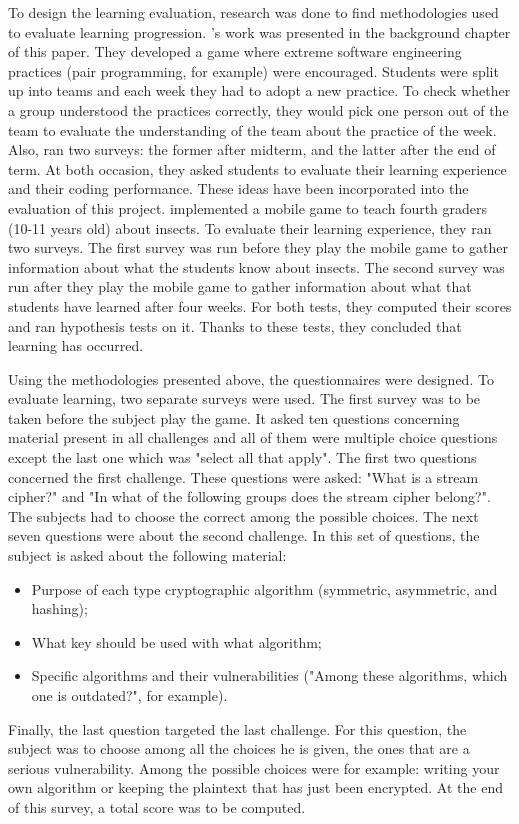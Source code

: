 \documentclass{l4proj}
\begin{document}
To design the learning evaluation, research was done to find methodologies used to evaluate learning progression.
\citet{akpolat_enhancing_2014}'s work was presented in the background chapter of this paper. 
They developed a game where extreme software engineering practices (pair programming, for example) were encouraged.
Students were split up into teams and each week they had to adopt a new practice.
To check whether a group understood the practices correctly, they would pick one person out of the team 
to evaluate the understanding of the team about the practice of the week.
Also, \citet{akpolat_enhancing_2014} ran two surveys: the former after midterm, and the latter after the end of term.
At both occasion, they asked students to evaluate their learning experience and their coding performance.
These ideas have been incorporated into the evaluation of this project.
\citet{su_mobile_2015} implemented a mobile game to teach fourth graders (10-11 years old) about insects.
To evaluate their learning experience, they ran two surveys. 
The first survey was run before they play the mobile game to gather information about what the students know about insects.
The second survey was run after they play the mobile game to gather information about what that students have learned after four weeks.
For both tests, they computed their scores and ran hypothesis tests on it.
Thanks to these tests, they concluded that learning has occurred.

Using the methodologies presented above, the questionnaires were designed.
To evaluate learning, two separate surveys were used.
The first survey was to be taken before the subject play the game.
It asked ten questions concerning material present in all challenges and all of them were multiple choice questions 
except the last one which was "select all that apply".
The first two questions concerned the first challenge. 
These questions were asked: "What is a stream cipher?" and "In what of the following groups does the stream cipher belong?".
The subjects had to choose the correct among the possible choices.
The next seven questions were about the second challenge.
In this set of questions, the subject is asked about the following material:
\begin{itemize}
    \item Purpose of each type cryptographic algorithm (symmetric, asymmetric, and hashing);
    \item What key should be used with what algorithm;
    \item Specific algorithms and their vulnerabilities ("Among these algorithms, which one is outdated?", for example).
\end{itemize}
Finally, the last question targeted the last challenge.
For this question, the subject was to choose among all the choices he is given, the ones that are a serious vulnerability.
Among the possible choices were for example: writing your own algorithm or keeping the plaintext that has just been encrypted.
At the end of this survey, a total score was to be computed.
\end{document}
